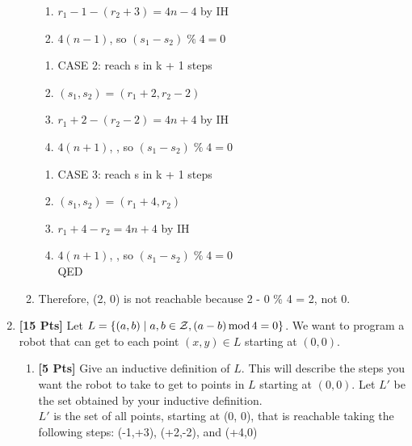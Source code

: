 \documentclass[11pt]{article}
\begin{document}
\begin{enumerate}
\begin{enumerate}
\begin{enumerate}
                \item $r_1 - 1 - (r_2 + 3) = 4n - 4$ \null\hfill by IH
                \item $4(n - 1)$, so $(s_1 - s_2)\;\%\; 4 = 0$
            \end{enumerate}
            \begin{enumerate}
                \item CASE 2: reach s in k + 1 steps
                \item $(s_1, s_2) = (r_1 + 2, r_2 - 2)$
                \item $r_1 + 2 - (r_2 - 2) = 4n + 4$ \null\hfill by IH
                \item $4(n + 1)$, , so $(s_1 - s_2)\;\%\; 4 = 0$
            \end{enumerate}
            \begin{enumerate}
                \item CASE 3: reach s in k + 1 steps
                \item $(s_1, s_2) = (r_1 + 4, r_2)$
                \item $r_1 + 4 - r_2 = 4n + 4$ \null\hfill by IH
                \item $4(n + 1)$, , so $(s_1 - s_2)\;\%\; 4 = 0$ \\ \null\hfill QED
            \end{enumerate}
            \item Therefore, (2, 0) is not reachable because 2 - 0 \% 4 = 2, not 0.
        \end{enumerate}

        \item {\bf [15 Pts]} Let $L = \{(a,b) \mid a,b \in {\cal Z}, (a-b) \, {\rm mod} \, 4 = 0\}$. We want to program a robot that can get to each point $(x,y) \in L$ starting at $(0,0)$.

        \begin{enumerate}

            \item {\bf [5 Pts]} Give an inductive definition of $L$. This will describe the steps you want the robot to take to get to points in $L$ starting at $(0,0)$. Let $L'$ be the set obtained by your inductive definition. \\
            $L'$ is the set of all points, starting at (0, 0), that is reachable taking the following steps: (-1,+3), (+2,-2), and (+4,0)


\end{enumerate}
\end{enumerate}
\end{document}
